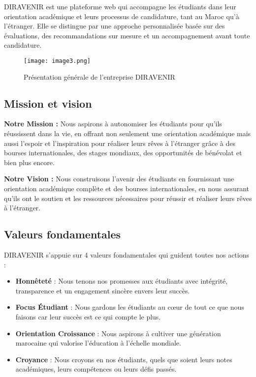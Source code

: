 \documentclass[12pt,a4paper]{report}
\begin{document}
DIRAVENIR est une plateforme web qui accompagne les étudiants dans leur orientation académique et leurs processus de candidature, tant au Maroc qu'à l'étranger. Elle se distingue par une approche personnalisée basée sur des évaluations, des recommandations sur mesure et un accompagnement avant toute candidature.

\begin{figure}[H]
\centering
\texttt{[image: image3.png]}
\caption{Présentation générale de l'entreprise DIRAVENIR}
\label{fig:presentation-entreprise}
\end{figure}

\subsection{Mission et vision}

\textbf{Notre Mission :} Nous aspirons à autonomiser les étudiants pour qu'ils réussissent dans la vie, en offrant non seulement une orientation académique mais aussi l'espoir et l'inspiration pour réaliser leurs rêves à l'étranger grâce à des bourses internationales, des stages mondiaux, des opportunités de bénévolat et bien plus encore.

\textbf{Notre Vision :} Nous construisons l'avenir des étudiants en fournissant une orientation académique complète et des bourses internationales, en nous assurant qu'ils ont le soutien et les ressources nécessaires pour réussir et réaliser leurs rêves à l'étranger.

\subsection{Valeurs fondamentales}

DIRAVENIR s'appuie sur 4 valeurs fondamentales qui guident toutes nos actions :

\begin{itemize}
    \item \textbf{Honnêteté} : Nous tenons nos promesses aux étudiants avec intégrité, transparence et un engagement sincère envers leur succès.
    
    \item \textbf{Focus Étudiant} : Nous gardons les étudiants au cœur de tout ce que nous faisons car leur succès est ce qui compte le plus.
    
    \item \textbf{Orientation Croissance} : Nous aspirons à cultiver une génération marocaine qui valorise l'éducation à l'échelle mondiale.
    
    \item \textbf{Croyance} : Nous croyons en nos étudiants, quels que soient leurs notes académiques, leurs compétences ou leurs défis passés.
\end{itemize}
\end{document}
